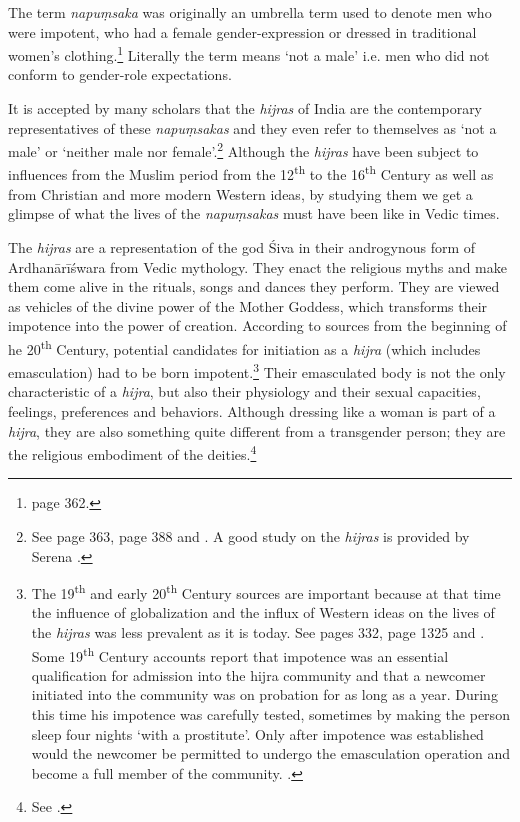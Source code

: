 The term {\em napuṃsaka} was originally an umbrella term used to denote men who were impotent, who had a female gender-expression or dressed in traditional women's clothing.\footnote{\cite{zwilling} page 362.} Literally the term means `not a male' i.e. men who did not conform to gender-role expectations. 

It is accepted by many scholars that the {\em hijras} of India are the contemporary representatives of these {\em napuṃsakas} and they even refer to themselves as `not a male' or `neither male nor female'.\footnote{See \cite{zwilling} page 363, \cite{goldman} page 388 and \cite{wendy}. A good study on the {\em hijras} is provided by Serena \cite{nanda}.} Although the {\em hijras} have been subject to influences from the Muslim period from the 12\textsuperscript{th} to the 16\textsuperscript{th} Century as well as from Christian and more modern Western ideas, by studying them we get a glimpse of what the lives of the {\em napuṃsakas} must have been like in Vedic times. 

The {\em hijras} are a representation of the god Śiva in their androgynous form of Ardhanārīśwara from Vedic mythology. They enact the religious myths and make them come alive in the rituals, songs and dances they perform. They are viewed as vehicles of the divine power of the Mother Goddess, which transforms their impotence into the power of creation. According to sources from the beginning of he 20\textsuperscript{th} Century, potential candidates for initiation as a {\em hijra} (which includes emasculation) had to be born impotent.\footnote{The 19\textsuperscript{th} and early 20\textsuperscript{th} Century sources are important because at that time the influence of globalization and the influx of Western ideas on the lives of the {\em hijras} was less prevalent as it is today. See \cite{ibbetson} pages 332, \cite{shah} page 1325 and \cite{bhimbhai}. Some 19\textsuperscript{th} Century accounts report that impotence was an essential qualification for admission into the hijra community and that a newcomer initiated into the community was on probation for as long as a year. During this time his impotence was carefully tested, sometimes by making the person sleep four nights `with a prostitute'. Only after impotence was established would the newcomer be permitted to undergo the emasculation operation and become a full member of the community. \cite{preston}.} Their emasculated body is not the only characteristic of a {\em hijra}, but also their physiology and their sexual capacities, feelings, preferences and behaviors. Although dressing like a woman is part of a {\em hijra}, they are also something quite different from a transgender person; they are the religious embodiment of the deities.\footnote{See \cite{nanda}.}

